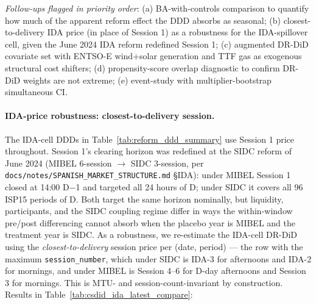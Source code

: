\documentclass[11pt,a4paper]{article}
\newcommand{\code}[1]{\nolinkurl{#1}}
\begin{document}
\emph{Follow-ups flagged in priority order}: (a) BA-with-controls comparison to quantify how much of the apparent reform effect the DDD absorbs as seasonal; (b) closest-to-delivery IDA price (in place of Session 1) as a robustness for the IDA-spillover cell, given the June 2024 IDA reform redefined Session 1; (c) augmented DR-DiD covariate set with ENTSO-E wind+solar generation and TTF gas as exogenous structural cost shifters; (d) propensity-score overlap diagnostic to confirm DR-DiD weights are not extreme; (e) event-study with multiplier-bootstrap simultaneous CI.










\paragraph{IDA-price robustness: closest-to-delivery session.}
The IDA-cell DDDs in Table~\ref{tab:reform_ddd_summary} use Session 1 price throughout. Session 1's clearing horizon was redefined at the SIDC reform of June 2024 (MIBEL 6-session $\to$ SIDC 3-session, per \code{docs/notes/SPANISH_MARKET_STRUCTURE.md} \S IDA): under MIBEL Session 1 closed at 14:00 D$-$1 and targeted all 24 hours of D; under SIDC it covers all 96 ISP15 periods of D. Both target the same horizon nominally, but liquidity, participants, and the SIDC coupling regime differ in ways the within-window pre/post differencing cannot absorb when the placebo year is MIBEL and the treatment year is SIDC. As a robustness, we re-estimate the IDA-cell DR-DiD using the \emph{closest-to-delivery} session price per (date, period) --- the row with the maximum \code{session_number}, which under SIDC is IDA-3 for afternoons and IDA-2 for mornings, and under MIBEL is Session 4--6 for D-day afternoons and Session 3 for mornings. This is MTU- and session-count-invariant by construction. Results in Table~\ref{tab:csdid_ida_latest_compare}:


\end{document}
